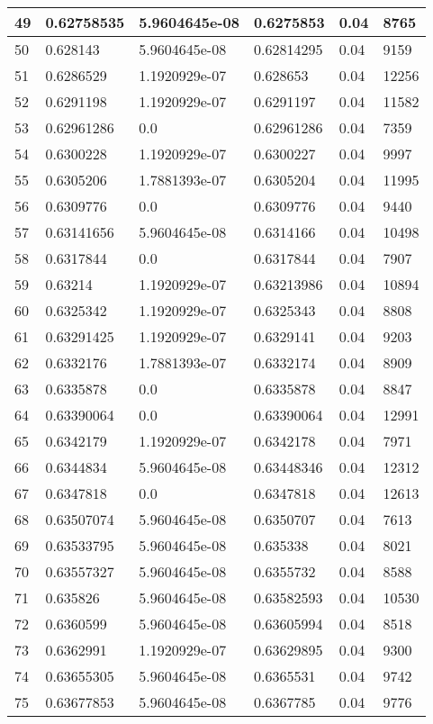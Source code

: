 \begin{longtable}{|l|l|l|l|l|l|}
49 & 0.62758535 & 5.9604645e-08 & 0.6275853 & 0.04 & 8765 \\ \hline 
50 & 0.628143 & 5.9604645e-08 & 0.62814295 & 0.04 & 9159 \\ \hline 
51 & 0.6286529 & 1.1920929e-07 & 0.628653 & 0.04 & 12256 \\ \hline 
52 & 0.6291198 & 1.1920929e-07 & 0.6291197 & 0.04 & 11582 \\ \hline 
53 & 0.62961286 & 0.0 & 0.62961286 & 0.04 & 7359 \\ \hline 
54 & 0.6300228 & 1.1920929e-07 & 0.6300227 & 0.04 & 9997 \\ \hline 
55 & 0.6305206 & 1.7881393e-07 & 0.6305204 & 0.04 & 11995 \\ \hline 
56 & 0.6309776 & 0.0 & 0.6309776 & 0.04 & 9440 \\ \hline 
57 & 0.63141656 & 5.9604645e-08 & 0.6314166 & 0.04 & 10498 \\ \hline 
58 & 0.6317844 & 0.0 & 0.6317844 & 0.04 & 7907 \\ \hline 
59 & 0.63214 & 1.1920929e-07 & 0.63213986 & 0.04 & 10894 \\ \hline 
60 & 0.6325342 & 1.1920929e-07 & 0.6325343 & 0.04 & 8808 \\ \hline 
61 & 0.63291425 & 1.1920929e-07 & 0.6329141 & 0.04 & 9203 \\ \hline 
62 & 0.6332176 & 1.7881393e-07 & 0.6332174 & 0.04 & 8909 \\ \hline 
63 & 0.6335878 & 0.0 & 0.6335878 & 0.04 & 8847 \\ \hline 
64 & 0.63390064 & 0.0 & 0.63390064 & 0.04 & 12991 \\ \hline 
65 & 0.6342179 & 1.1920929e-07 & 0.6342178 & 0.04 & 7971 \\ \hline 
66 & 0.6344834 & 5.9604645e-08 & 0.63448346 & 0.04 & 12312 \\ \hline 
67 & 0.6347818 & 0.0 & 0.6347818 & 0.04 & 12613 \\ \hline 
68 & 0.63507074 & 5.9604645e-08 & 0.6350707 & 0.04 & 7613 \\ \hline 
69 & 0.63533795 & 5.9604645e-08 & 0.635338 & 0.04 & 8021 \\ \hline 
70 & 0.63557327 & 5.9604645e-08 & 0.6355732 & 0.04 & 8588 \\ \hline 
71 & 0.635826 & 5.9604645e-08 & 0.63582593 & 0.04 & 10530 \\ \hline 
72 & 0.6360599 & 5.9604645e-08 & 0.63605994 & 0.04 & 8518 \\ \hline 
73 & 0.6362991 & 1.1920929e-07 & 0.63629895 & 0.04 & 9300 \\ \hline 
74 & 0.63655305 & 5.9604645e-08 & 0.6365531 & 0.04 & 9742 \\ \hline 
75 & 0.63677853 & 5.9604645e-08 & 0.6367785 & 0.04 & 9776 \\ \hline 
\end{longtable}